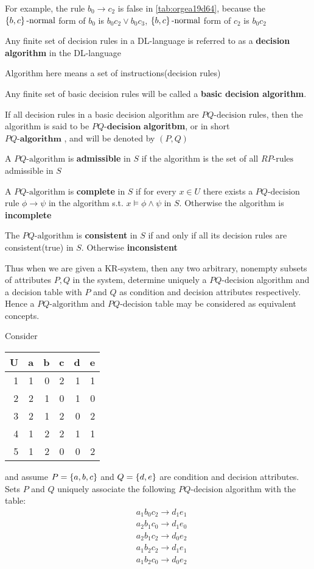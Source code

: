 \documentclass[11pt]{article}
\begin{document}
For example, the rule \(b_0 \to c_2\) is false in \ref{tab:orgea19d64}, because the 
\(\left\{ b,c\right\}\text{-normal}\) form of \(b_0\) is \(b_0 c_2 \vee b_0 c_3\), 
\(\left\{ b,c\right\}\text{-normal}\) form of \(c_2\) is \(b_0 c_2\)

Any finite set of decision rules in a DL-language is referred to as a
\textbf{decision algorithm} in the DL-language

Algorithm here means a set of instructions(decision rules)

Any finite set of basic decision rules will be called a \textbf{basic decision algorithm}.

If all decision rules in a basic decision algorithm are 
\(PQ\text{-decision}\) rules, then the algorithm is said to be 
\(PQ\textbf{-decision}\) \textbf{algoritbm}, or in short\\
\(PQ\textbf{-algorithm}\) , and will be denoted by \((P,Q)\)

A \(PQ\text{-algorithm}\) is \textbf{admissible} in \(S\) if the algorithm is the set of
all \(RP\text{-rules}\) admissible in \(S\)

A \(PQ\text{-algorithm}\) is \textbf{complete} in \(S\) if for every \(x\in U\) there exists
a \(PQ\text{-decision}\) rule \(\phi\to\psi\) in the algorithm s.t. \(x\models\phi\wedge\psi\)
in \(S\). Otherwise the algorithm is \textbf{incomplete}

The \(PQ\text{-algorithm}\) is \textbf{consistent} in \(S\) if and only if all its
decision rules are consistent(true) in \(S\). Otherwise \textbf{inconsistent}


Thus when we are given a KR-system, then any two arbitrary, nonempty subsets
of attributes \(P,Q\) in the system, determine uniquely a 
\(PQ\text{-decision}\) algorithm and a decision table with \(P\) and \(Q\) as
condition and decision attributes respectively. Hence a 
\(PQ\text{-algorithm}\) and
\(PQ\text{-decision}\) table may be considered as 
equivalent concepts.

Consider
\begin{center}
\begin{tabular}{rrrrrr}
U & a & b & c & d & e\\
\hline
1 & 1 & 0 & 2 & 1 & 1\\
2 & 2 & 1 & 0 & 1 & 0\\
3 & 2 & 1 & 2 & 0 & 2\\
4 & 1 & 2 & 2 & 1 & 1\\
5 & 1 & 2 & 0 & 0 & 2\\
\end{tabular}
\end{center}
and assume \(P=\left\{ a,b,c\right\}\) and \(Q=\left\{ d,e\right\}\) are condition and decision
attributes. Sets \(P\) and \(Q\) uniquely associate the following
\(PQ\text{-decision}\) algorithm with the table:
\begin{align*}
  &a_1b_0c_2\to d_1e_1\\
  &a_2b_1c_0\to d_1e_0\\
  &a_2b_1c_2\to d_0e_2\\
  &a_1b_2c_2\to d_1e_1\\
  &a_1b_2c_0\to d_0e_2\\
\end{align*}
\end{document}
